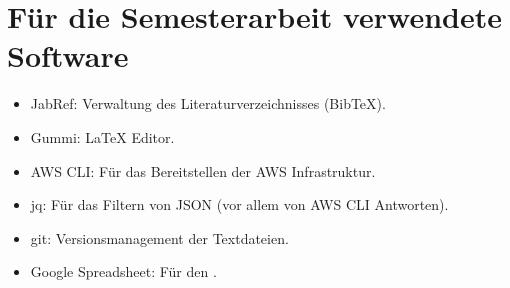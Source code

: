 \section{Für die Semesterarbeit verwendete Software}
\begin{itemize}
\item JabRef: Verwaltung des Literaturverzeichnisses (BibTeX).
\item Gummi: LaTeX Editor.
\item AWS CLI: Für das Bereitstellen der AWS Infrastruktur.
\item jq: Für das Filtern von JSON (vor allem von AWS CLI Antworten).
\item git: Versionsmanagement der Textdateien.
\item Google Spreadsheet: Für den .
\end{itemize}